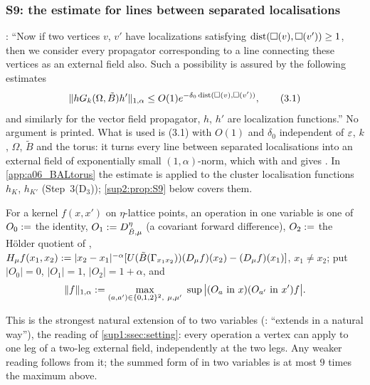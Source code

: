 
\subsubsection{S9: the estimate \cite[(3.1)]{Ba3} for lines between separated localisations}\label{sup2:ssec:S9}

\cite[p.~432]{Ba3}: ``Now if two vertices $v$, $v'$ have localizations satisfying $\operatorname{dist}(\square(v),\square(v'))\ge1$, then we consider every propagator corresponding to a line connecting these vertices as an external field also. Such a possibility is assured by the following estimates
\[
\lVert hG_k(\Omega,\tilde B)h'\rVert_{1,\alpha}\le O(1)e^{-\delta_0\operatorname{dist}(\square(v),\square(v'))},\tag{3.1}
\]
and similarly for the vector field propagator, $h$, $h'$ are localization functions.'' No argument is printed. What is used is (3.1) with $O(1)$ and $\delta_0$ independent of $\varepsilon$, $k$, $\Omega$, $\tilde B$ and the torus: it turns every line between separated localisations into an external field of exponentially small $(1,\alpha)$-norm, which with \cite[(2.5)]{Ba3} and \cite[(3.2)]{Ba3} gives \cite[(1.33)]{Ba3}. In \cref{app:a06_BALtorus} the estimate is applied to the cluster localisation functions $h_K$, $h_{K'}$ (Step~3(D$_3$)); \cref{sup2:prop:S9} below covers them.

\begin{definition}\label{sup2:def:S9norm}
For a kernel $f(x,x')$ on $\eta$-lattice points, an operation in one variable is one of $O_0:=$ the identity, $O_1:= D^\eta_{\tilde B,\mu}$ (a covariant forward difference), $O_2:=$ the H\"older quotient of \cite[(1.32)]{Ba3}, $H_\mu f(x_1,x_2):=|x_2-x_1|^{-\alpha}[U(\tilde B(\Gamma_{x_1x_2}))(D_\mu f)(x_2)-(D_\mu f)(x_1)]$, $x_1\ne x_2$; put $|O_0|=0$, $|O_1|=1$, $|O_2|=1+\alpha$, and
\[
\norm f_{1,\alpha}\defeq\max_{(a,a')\in\{0,1,2\}^2,\ \mu,\mu'}\ \sup\big|(O_a\text{ in }x)(O_{a'}\text{ in }x')f\big|.
\]
\end{definition}

This is the strongest natural extension of \cite[(1.32)]{Ba3} to two variables (\cite[p.~420]{Ba3}: ``extends in a natural way''), the reading of \cref{sup1:ssec:setting}: every operation a vertex can apply to one leg of a two-leg external field, independently at the two legs. Any weaker reading follows from it; the summed form of \cite[(1.32)]{Ba3} in two variables is at most $9$ times the maximum above.

